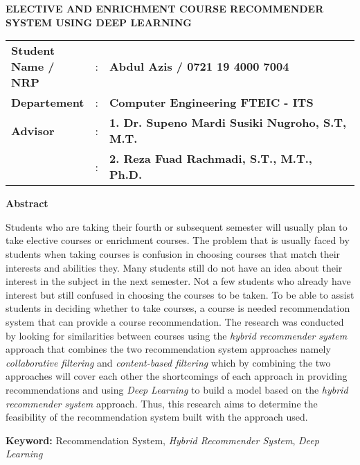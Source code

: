 {
\begin{center}
    \uppercase{\textbf{\large Elective and Enrichment Course Recommender System using Deep Learning}}
\end{center}

\vspace*{6 mm}
\begin{adjustwidth}{}{}
    \begin{tabular}{lcp{1\linewidth}}
        \noindent\textbf{Student Name / NRP} & : & \textbf{Abdul Azis / 0721 19 4000 7004}                \\
        \noindent\textbf{Departement}        & : & \textbf{Computer Engineering FTEIC - ITS}              \\
        \noindent\textbf{Advisor}            & : & \textbf{1. Dr. Supeno Mardi Susiki Nugroho, S.T, M.T.} \\
                                             & : & \textbf{2. Reza Fuad Rachmadi, S.T., M.T., Ph.D.}      \\
    \end{tabular}
\end{adjustwidth}

\vspace{6 mm}
\noindent
\textbf{Abstract}
\vspace{3 mm}

Students who are taking their fourth or subsequent semester will usually plan to take elective courses or enrichment courses.
The problem that is usually faced by students when taking courses is confusion in choosing courses that match their interests and abilities
they. Many students still do not have an idea about their interest in the subject in the next semester. Not a few students who already have
interest but still confused in choosing the courses to be taken. To be able to assist students in deciding whether to take courses, a course is needed
recommendation system that can provide a course recommendation. The research was conducted by looking for similarities between courses using the \emph{hybrid recommender system} approach that combines the two
recommendation system approaches namely \emph{collaborative filtering} and \emph{content-based filtering} which by combining the two approaches will cover each other
the shortcomings of each approach in providing recommendations and using \emph{Deep Learning} to build a model based on the \emph{hybrid recommender system} approach. Thus, this research
aims to determine the feasibility of the recommendation system built with the approach used.

\vspace{6 mm}
\noindent
\textbf{Keyword: }Recommendation System, \emph{Hybrid Recommender System}, \emph{Deep Learning}
}



